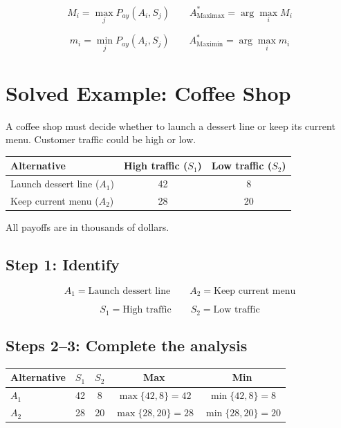 	\[
	\boxed{
		M_i=\max_j P_{ay}(A_i,S_j)
		\qquad
		A^*_{\mathrm{Maximax}}=\arg\max_i M_i
	}
	\]
	
	\[
	\boxed{
		m_i=\min_j P_{ay}(A_i,S_j)
		\qquad
		A^*_{\mathrm{Maximin}}=\arg\max_i m_i
	}
	\]
	
	
	\section{Solved Example: Coffee Shop}
	
	A coffee shop must decide whether to launch a dessert line or keep its
	current menu. Customer traffic could be high or low.
	
	\begin{center}
		\renewcommand{\arraystretch}{1.3}
		\begin{tabular}{lcc}
			\toprule
			Alternative & High traffic ($S_1$) & Low traffic ($S_2$) \\
			\midrule
			Launch dessert line ($A_1$) & 42 & 8 \\
			Keep current menu ($A_2$) & 28 & 20 \\
			\bottomrule
		\end{tabular}
	\end{center}
	
	All payoffs are in thousands of dollars.
	
	\subsection*{Step 1: Identify}
	
	\[
	A_1=\text{Launch dessert line}
	\qquad
	A_2=\text{Keep current menu}
	\]
	
	\[
	S_1=\text{High traffic}
	\qquad
	S_2=\text{Low traffic}
	\]
	
	\subsection*{Steps 2--3: Complete the analysis}
	
	\begin{center}
		\renewcommand{\arraystretch}{1.6}
		\begin{tabular}{lcccc}
			\toprule
			Alternative & $S_1$ & $S_2$ & Max & Min \\
			\midrule
			$A_1$ & 42 & 8 & $\max\{42,8\}=42$ & $\min\{42,8\}=8$ \\
			$A_2$ & 28 & 20 & $\max\{28,20\}=28$ & $\min\{28,20\}=20$ \\
			\bottomrule
		\end{tabular}
	\end{center}
	

